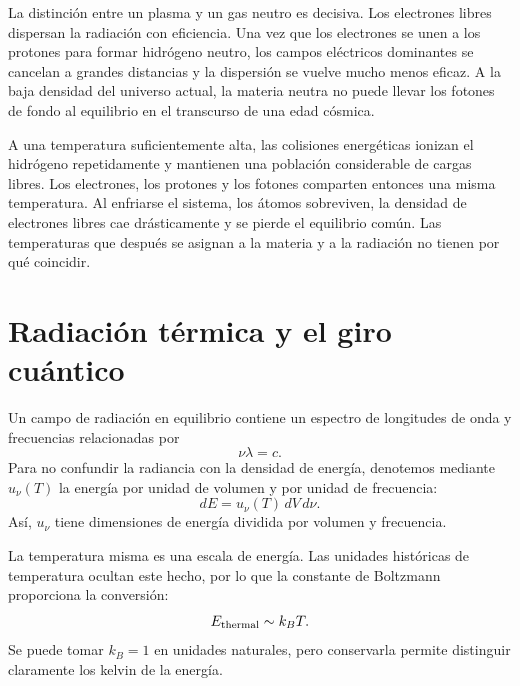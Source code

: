 La distinción entre un plasma y un gas neutro es decisiva. Los electrones libres dispersan la radiación con eficiencia. Una vez que los electrones se unen a los protones para formar hidrógeno neutro, los campos eléctricos dominantes se cancelan a grandes distancias y la dispersión se vuelve mucho menos eficaz. A la baja densidad del universo actual, la materia neutra no puede llevar los fotones de fondo al equilibrio en el transcurso de una edad cósmica.

A una temperatura suficientemente alta, las colisiones energéticas ionizan el hidrógeno repetidamente y mantienen una población considerable de cargas libres. Los electrones, los protones y los fotones comparten entonces una misma temperatura. Al enfriarse el sistema, los átomos sobreviven, la densidad de electrones libres cae drásticamente y se pierde el equilibrio común. Las temperaturas que después se asignan a la materia y a la radiación no tienen por qué coincidir.

\begin{classroomqa}
\end{classroomqa}

\section{Radiación térmica y el giro cuántico}

Un campo de radiación en equilibrio contiene un espectro de longitudes de onda y frecuencias relacionadas por
\begin{equation}
\nu\lambda=c.
\end{equation}
Para no confundir la radiancia con la densidad de energía, denotemos mediante \(u_\nu(T)\) la energía por unidad de volumen y por unidad de frecuencia:
\begin{equation}
dE=u_\nu(T)\,dV\,d\nu.
\label{eq:c07-spectral-density}
\end{equation}
Así, \(u_\nu\) tiene dimensiones de energía dividida por volumen y frecuencia.

La temperatura misma es una escala de energía. Las unidades históricas de temperatura ocultan este hecho, por lo que la constante de Boltzmann proporciona la conversión:
\begin{equation}
E_{\rm thermal}\sim k_B T.
\end{equation}
Se puede tomar \(k_B=1\) en unidades naturales, pero conservarla permite distinguir claramente los kelvin de la energía.

